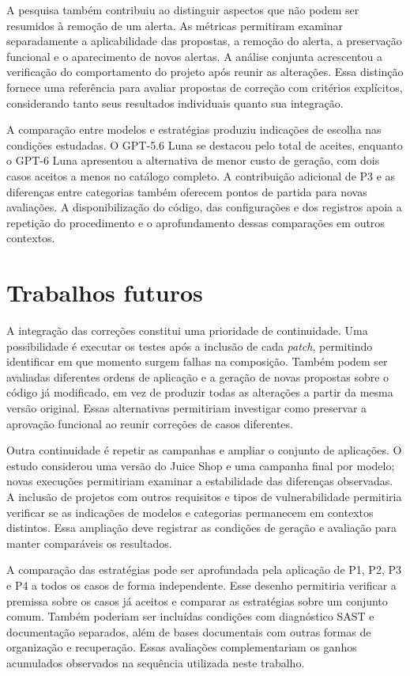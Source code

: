 A pesquisa também contribuiu ao distinguir aspectos que não podem ser resumidos à remoção de um alerta. As métricas permitiram examinar separadamente a aplicabilidade das propostas, a remoção do alerta, a preservação funcional e o aparecimento de novos alertas. A análise conjunta acrescentou a verificação do comportamento do projeto após reunir as alterações. Essa distinção fornece uma referência para avaliar propostas de correção com critérios explícitos, considerando tanto seus resultados individuais quanto sua integração.

A comparação entre modelos e estratégias produziu indicações de escolha nas condições estudadas. O GPT-5.6 Luna se destacou pelo total de aceites, enquanto o GPT-6 Luna apresentou a alternativa de menor custo de geração, com dois casos aceitos a menos no catálogo completo. A contribuição adicional de P3 e as diferenças entre categorias também oferecem pontos de partida para novas avaliações. A disponibilização do código, das configurações e dos registros apoia a repetição do procedimento e o aprofundamento dessas comparações em outros contextos.

\section{Trabalhos futuros}

\label{sec:cf-trabalhos-futuros}

A integração das correções constitui uma prioridade de continuidade. Uma possibilidade é executar os testes após a inclusão de cada \textit{patch}, permitindo identificar em que momento surgem falhas na composição. Também podem ser avaliadas diferentes ordens de aplicação e a geração de novas propostas sobre o código já modificado, em vez de produzir todas as alterações a partir da mesma versão original. Essas alternativas permitiriam investigar como preservar a aprovação funcional ao reunir correções de casos diferentes.

Outra continuidade é repetir as campanhas e ampliar o conjunto de aplicações. O estudo considerou uma versão do Juice Shop e uma campanha final por modelo; novas execuções permitiriam examinar a estabilidade das diferenças observadas. A inclusão de projetos com outros requisitos e tipos de vulnerabilidade permitiria verificar se as indicações de modelos e categorias permanecem em contextos distintos. Essa ampliação deve registrar as condições de geração e avaliação para manter comparáveis os resultados.

A comparação das estratégias pode ser aprofundada pela aplicação de P1, P2, P3 e P4 a todos os casos de forma independente. Esse desenho permitiria verificar a premissa sobre os casos já aceitos e comparar as estratégias sobre um conjunto comum. Também poderiam ser incluídas condições com diagnóstico SAST e documentação separados, além de bases documentais com outras formas de organização e recuperação. Essas avaliações complementariam os ganhos acumulados observados na sequência utilizada neste trabalho.

